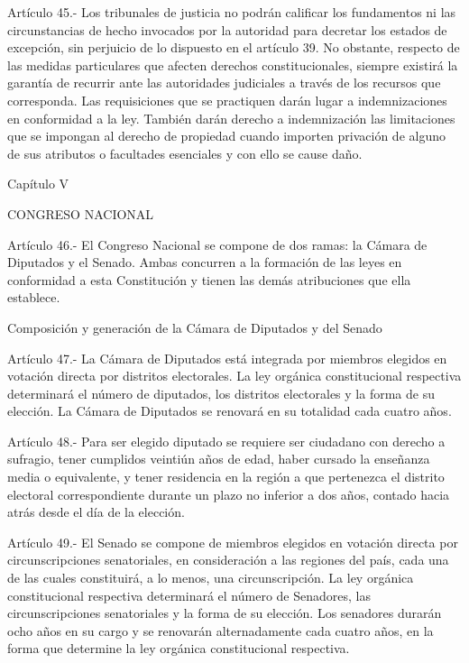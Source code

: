     Artículo 45.- Los tribunales de justicia no podrán calificar los fundamentos ni las circunstancias de hecho invocados por la autoridad para decretar los estados de excepción, sin perjuicio de lo dispuesto en el artículo 39. No obstante, respecto de las medidas particulares que afecten derechos constitucionales, siempre existirá la garantía de recurrir ante las autoridades judiciales a través de los recursos que corresponda.
    Las requisiciones que se practiquen darán lugar a indemnizaciones en conformidad a la ley. También darán derecho a indemnización las limitaciones que se impongan al derecho de propiedad cuando importen privación de alguno de sus atributos o facultades esenciales y con ello se cause daño.



    Capítulo V

    CONGRESO NACIONAL



    Artículo 46.- El Congreso Nacional se compone de dos ramas: la Cámara de Diputados y el Senado. Ambas concurren a la formación de las leyes en conformidad a esta Constitución y tienen las demás atribuciones que ella establece.



    Composición y generación de la Cámara de Diputados y del Senado



    Artículo 47.- La Cámara de Diputados está integrada por miembros elegidos en votación directa por distritos electorales. La ley orgánica constitucional respectiva determinará el número de diputados, los distritos electorales y la forma de su elección.
    La Cámara de Diputados se renovará en su totalidad cada cuatro años.




    Artículo 48.- Para ser elegido diputado se requiere ser ciudadano con derecho a sufragio, tener cumplidos veintiún años de edad, haber cursado la enseñanza media o equivalente, y tener residencia en la región a que pertenezca el distrito electoral correspondiente durante un plazo no inferior a dos años, contado hacia atrás desde el día de la elección.



    Artículo 49.- El Senado se compone de miembros elegidos en votación directa por circunscripciones senatoriales, en consideración a las regiones del país, cada una de las cuales constituirá, a lo menos, una circunscripción. La ley orgánica constitucional respectiva determinará el número de Senadores, las circunscripciones senatoriales y la forma de su elección.
    Los senadores durarán ocho años en su cargo y se renovarán alternadamente cada cuatro años, en la forma que determine la ley orgánica constitucional respectiva.



